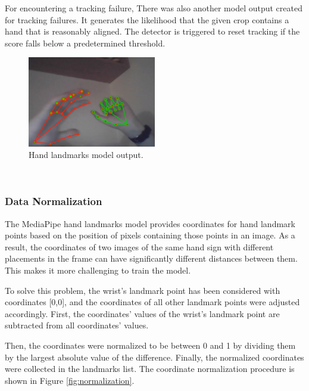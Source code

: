 For encountering a tracking failure, There was also another model output created for tracking failures. It generates the likelihood that the given crop contains a hand that is reasonably aligned. The detector is triggered to reset tracking if the score falls below a predetermined threshold.

\begin{figure}
	\centering
	\includegraphics[width = 0.5\textwidth]{images/landmarks_both_hands.png}
	\caption{Hand landmarks model output.}
	\label{fig:landmark_both_hands}
\end{figure}

\par~
\newline

\subsubsection*{Data Normalization}\label{sec:norm}
The MediaPipe hand landmarks model provides coordinates for hand landmark points based on the position of pixels containing those points in an image. As a result, the coordinates of two images of the same hand sign with different placements in the frame can have significantly different distances between them. This makes it more challenging to train the model.

To solve this problem, the wrist's landmark point has been considered with coordinates [0,0], and the coordinates of all other landmark points were adjusted accordingly.
First, the coordinates' values of the wrist's landmark point are subtracted from all coordinates' values.

Then, the coordinates were normalized to be between 0 and 1 by dividing them by the largest absolute value of the difference. Finally, the normalized coordinates were collected in the landmarks list. The coordinate normalization procedure is shown in Figure \ref{fig:normalization}.


